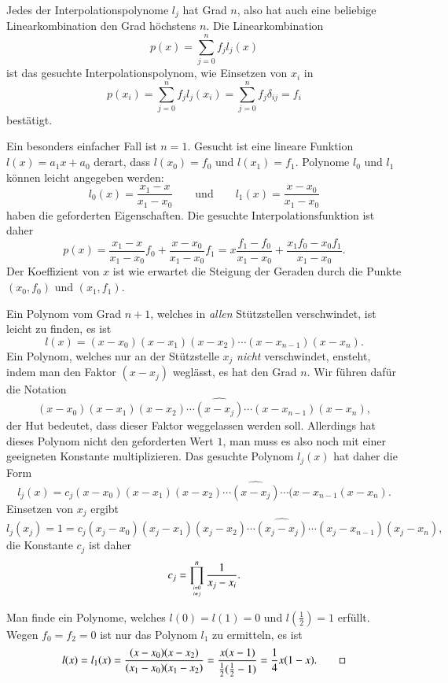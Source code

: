 Jedes der Interpolationspolynome $l_j$ hat Grad $n$, also hat auch eine
beliebige Linearkombination den Grad höchstens $n$.
%
Die Linearkombination
\[
p(x) = \sum_{j=0}^n f_j l_j(x)
\]
ist das gesuchte Interpolationspolynom, wie Einsetzen von $x_i$ in
\[
p(x_i)
=
\sum_{j=0}^n f_jl_j(x_i)
=
\sum_{j=0}^n f_j\delta_{ij}
=
f_i
\]
bestätigt.

\begin{beispiel}
Ein besonders einfacher Fall ist $n=1$.
Gesucht ist eine lineare Funktion $l(x)=a_1x+a_0$ derart, dass
$l(x_0)=f_0$ und $l(x_1)=f_1$.
Polynome $l_0$ und $l_1$ können leicht angegeben werden:
\[
l_0(x) = \frac{x_1-x}{x_1-x_0}
\qquad\text{und}\qquad
l_1(x) = \frac{x-x_0}{x_1-x_0}
\]
haben die geforderten Eigenschaften.
Die gesuchte Interpolationsfunktion ist daher
\[
p(x)
=
\frac{x_1-x}{x_1-x_0}f_0 + \frac{x-x_0}{x_1-x_0} f_1
=
x \frac{f_1-f_0}{x_1-x_0}   + \frac{x_1f_0-x_0f_1}{x_1-x_0}.
\]
Der Koeffizient von $x$ ist wie erwartet die Steigung der Geraden durch
die Punkte $(x_0,f_0)$ und $(x_1,f_1)$.
\end{beispiel}

Ein Polynom vom Grad $n+1$, welches in {\em allen} Stützstellen verschwindet,
ist leicht zu finden, es ist 
\[
l(x)
=
(x-x_0)(x-x_1)(x-x_2)\cdots (x-x_{n-1})(x-x_n).
\]
%
Ein Polynom, welches nur an der Stützstelle $x_j$ {\em nicht} verschwindet,
ensteht, indem man den Faktor $(x-x_j)$ weglässt, es hat den Grad $n$.
Wir führen dafür die Notation
\[
(x-x_0)(x-x_1)(x-x_2)\cdots \widehat{(x-x_j)}\cdots (x-x_{n-1})(x-x_n),
\]
der Hut bedeutet, dass dieser Faktor weggelassen werden soll.
Allerdings hat dieses Polynom nicht den geforderten Wert $1$, man muss es
also noch mit einer geeigneten Konstante multiplizieren.
Das gesuchte Polynom $l_j(x)$ hat daher die Form
\[
l_j(x)
=
c_j(x-x_0)(x-x_1)(x-x_2)\cdots \widehat{(x-x_j)}\cdots (x-x_{n-1}(x-x_n).
\]
Einsetzen von $x_j$ ergibt
\[
l_j(x_j) = 1 = 
c_j(x_j-x_0)(x_j-x_1)(x_j-x_2)\cdots \widehat{(x_j-x_j)}\cdots(x_j-x_{n-1})(x_j-x_n),
\]
%
die Konstante $c_j$ ist daher
\[
c_j = \prod_{i=0\atop i\ne j}^n \frac{1}{x_j-x_i}.
\]

\begin{beispiel}
Man finde ein Polynome, welches $l(0)=l(1)=0$ und $l(\frac12)=1$
erfüllt.
Wegen $f_0=f_2=0$ ist nur das Polynom $l_1$ zu ermitteln, es ist
\[
l(x) = l_1(x)
=
\frac{(x-x_0)(x-x_2)}{(x_1-x_0)(x_1-x_2)}
=
\frac{x(x-1)}{\frac12(\frac12-1)}
=
\frac14x(1-x).
\qedhere
\]
\end{beispiel}

